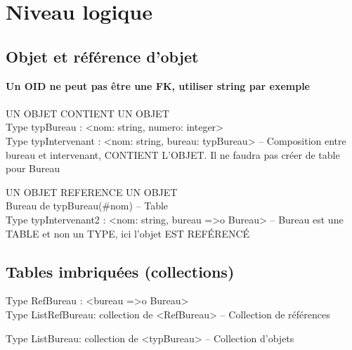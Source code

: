 \documentclass[11pt,a4paper,oneside,french,svgnames]{report}
\begin{document}
\section*{Niveau logique}
\subsection*{Objet et référence d'objet}
\textbf{Un OID ne peut pas être une FK, utiliser string par exemple}\\\\
UN OBJET CONTIENT UN OBJET\\
Type typBureau : <nom: string, numero: integer>\\
Type typIntervenant : <nom: string, bureau: typBureau> -- Composition entre bureau et intervenant, CONTIENT L'OBJET. Il ne faudra pas créer de table pour Bureau

UN OBJET REFERENCE UN OBJET\\
Bureau de typBureau(\#nom) -- Table\\
Type typIntervenant2 : <nom: string, bureau =>o Bureau> -- Bureau est une TABLE et non un TYPE, ici l'objet EST REFÉRENCÉ
\subsection*{Tables imbriquées (collections)}
Type RefBureau : <bureau =>o Bureau>\\
Type ListRefBureau: collection de <RefBureau> -- Collection de références

Type ListBureau: collection de <typBureau> -- Collection d'objets
\end{document}
